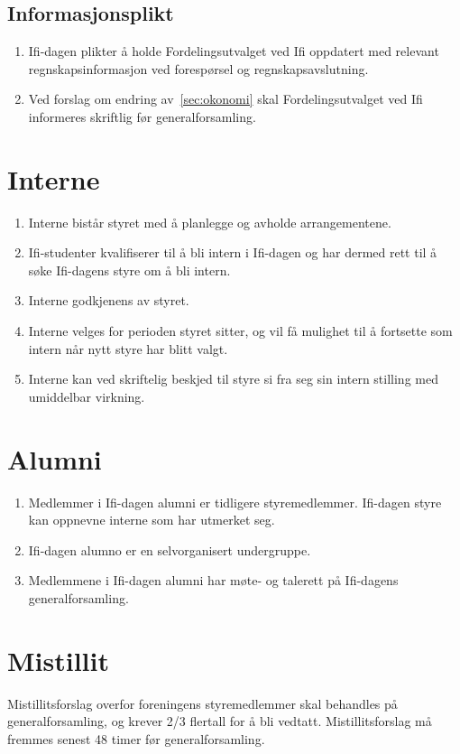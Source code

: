 \documentclass[norsk,a4paper]{article}
\begin{document}
\subsection{Informasjonsplikt}
\begin{enumerate}
    \item{Ifi-dagen plikter å holde Fordelingsutvalget ved Ifi oppdatert med relevant regnskapsinformasjon ved forespørsel og regnskapsavslutning.}
    \item{Ved forslag om endring av~\ref{sec:okonomi} skal Fordelingsutvalget ved Ifi informeres skriftlig før generalforsamling.}
\end{enumerate}

\section{Interne}
\begin{enumerate}
    \item{Interne bistår styret med å planlegge og avholde arrangementene.}
    \item{Ifi-studenter kvalifiserer til å bli intern i Ifi-dagen og har dermed rett til å søke Ifi-dagens styre om å bli intern.}
    \item{Interne godkjenens av styret.}
    \item{Interne velges for perioden styret sitter, og vil få mulighet til å fortsette som intern når nytt styre har blitt valgt.}
    \item{Interne kan ved skriftelig beskjed til styre si fra seg sin intern stilling med umiddelbar virkning.}
\end{enumerate}

\section{Alumni}
\begin{enumerate}
    \item{Medlemmer i Ifi-dagen alumni er tidligere styremedlemmer. Ifi-dagen styre kan oppnevne interne som har utmerket seg.}
    \item{Ifi-dagen alumno er en selvorganisert undergruppe.}
    \item{Medlemmene i Ifi-dagen alumni har møte- og talerett på Ifi-dagens generalforsamling.}
\end{enumerate}

\section{Mistillit}
Mistillitsforslag overfor foreningens styremedlemmer skal behandles på generalforsamling, og krever 2/3 flertall for å bli vedtatt. Mistillitsforslag må fremmes senest 48 timer før generalforsamling.
\end{document}

